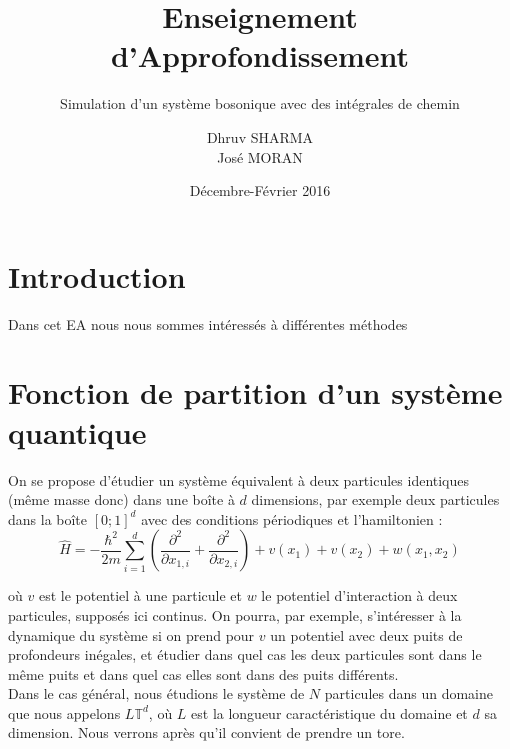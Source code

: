 \documentclass[11pt]{article}
\title{Enseignement d'Approfondissement}
\date{Décembre-Février 2016}
\author{Dhruv SHARMA \\ José MORAN}
\subtitle{Simulation d'un système bosonique avec des intégrales de chemin}
\theoremstyle{definition}
\theoremstyle{remark}
\newcommand{\hham}{\hat{H}}
\newcommand{\dom}{L\mathbb{T}^d}
\begin{document}
\maketitle
\newpage
\tableofcontents
\newpage
\section*{Introduction}
Dans cet EA nous nous sommes intéressés à différentes méthodes 


\newpage
\section{Fonction de partition d'un système quantique}
On se propose d'étudier un système équivalent à deux particules identiques (même masse donc) dans une boîte à $d$ dimensions, par exemple deux particules dans la boîte $[0;1]^d$ avec des conditions périodiques et l'hamiltonien :
\begin{equation}
\hham = -\frac{\hbar^2}{2m}\sum_{i=1}^{d}\left( \frac{\partial^2}{\partial x_{1,i}}+\frac{\partial^2}{\partial x_{2,i}}\right)+v(x_1)+v(x_2)+w(x_1,x_2)
\end{equation}

où $v$ est le potentiel à une particule et $w$ le potentiel d'interaction à deux particules, supposés ici continus. On pourra, par exemple, s'intéresser à la dynamique du système si on prend pour $v$ un potentiel avec deux puits de profondeurs inégales, et étudier dans quel cas les deux particules sont dans le même puits et dans quel cas elles sont dans des puits différents.
\\

Dans le cas général, nous étudions le système de $N$ particules dans un domaine que nous appelons $\dom$, où $L$ est la longueur caractéristique du domaine et $d$ sa dimension. Nous verrons après qu'il convient de prendre un tore.
\\
\end{document}
